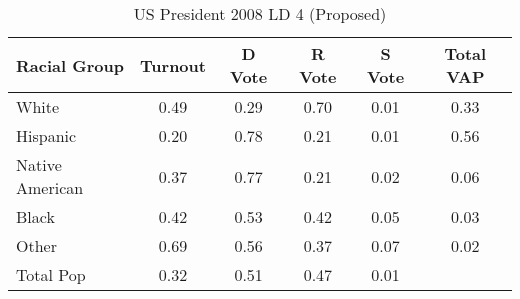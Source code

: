 \begin{table}[htb]
\begin{center}
\caption{US President 2008 LD 4 (Proposed)}
\label{pres08_vap_ld_4}
\begin{tabular}{lccccc}
  \hline
Racial Group & Turnout & D Vote & R Vote & S Vote & Total VAP \\ 
  \hline
White & 0.49 & 0.29 & 0.70 & 0.01 & 0.33 \\ 
  Hispanic & 0.20 & 0.78 & 0.21 & 0.01 & 0.56 \\ 
  Native American & 0.37 & 0.77 & 0.21 & 0.02 & 0.06 \\ 
  Black & 0.42 & 0.53 & 0.42 & 0.05 & 0.03 \\ 
  Other & 0.69 & 0.56 & 0.37 & 0.07 & 0.02 \\ 
  Total Pop & 0.32 & 0.51 & 0.47 & 0.01 &  \\ 
   \hline
\end{tabular}
\end{center}
\end{table}
